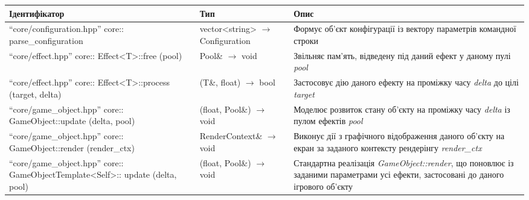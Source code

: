 \small{
  \begin{tabular}{| C{6cm} | C{4cm} | C{5cm} |}
    \hline
    Ідентифікатор & Тип & Опис \\
    \hline
    ``core/configuration.hpp'' \newline core:: \newline parse_configuration
    & vector<string> $\to$ Configuration
    & Формує об'єкт конфігурації із вектору параметрів командної строки \\
    \hline
    ``core/effect.hpp'' \newline core:: \newline Effect<T>::free \newline (pool)
    & Pool\& $\to$ void
    & Звільняє пам'ять, відведену під даний ефект у даному пулі \emph{pool} \\
    \hline
    ``core/effect.hpp'' \newline core:: \newline Effect<T>::process \newline (target, delta)
    & (T\&, float) $\to$ bool
    & Застосовує дію даного ефекту на проміжку часу \emph{delta} до цілі \emph{target} \\
    \hline
    ``core/game_object.hpp'' \newline core:: \newline
    GameObject::update \newline (delta, pool)
    & (float, Pool\&) $\to$ void
    & Моделює розвиток стану об'єкту на проміжку часу \emph{delta} із пулом ефектів \emph{pool} \\
    \hline
    ``core/game_object.hpp'' \newline core:: \newline
    GameObject::render \newline (render_ctx)
    & RenderContext\& $\to$ void
    & Виконує дії з графічного відображення даного об'єкту на екран
      за заданого контексту рендерінгу \emph{render_ctx} \\
    \hline
    ``core/game_object.hpp'' \newline core:: \newline
    GameObjectTemplate<Self>:: \newline update \newline (delta, pool)
    & (float, Pool\&) $\to$ void
    & Стандартна реалізація \emph{GameObject::render}, що поновлює із заданими параметрами усі ефекти, застосовані до даного ігрового об'єкту \\
    \hline

\end{tabular}}
